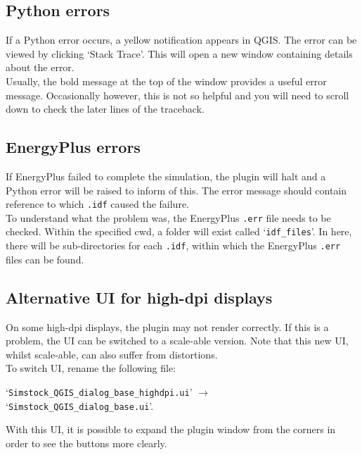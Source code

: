 \documentclass{article}
\begin{document}
\subsection{Python errors}
If a Python error occurs, a yellow notification appears in QGIS. The error can be viewed by clicking `Stack Trace'. This will open a new window containing details about the error. \\

Usually, the bold message at the top of the window provides a useful error message. Occasionally however, this is not so helpful and you will need to scroll down to check the later lines of the traceback.

\subsection{EnergyPlus errors}
If EnergyPlus failed to complete the simulation, the plugin will halt and a Python error will be raised to inform of this. The error message should contain reference to which \texttt{.idf} caused the failure. \\

To understand what the problem was, the EnergyPlus \texttt{.err} file needs to be checked. Within the specified cwd, a folder will exist called `\texttt{idf\_files}'. In here, there will be sub-directories for each \texttt{.idf}, within which the EnergyPlus \texttt{.err} files can be found.


\subsection{Alternative UI for high-dpi displays}
\label{section:highdpi}
On some high-dpi displays, the plugin may not render correctly. If this is a problem, the UI can be switched to a scale-able version. Note that this new UI, whilst scale-able, can also suffer from distortions. \\

To switch UI, rename the following file:
\begin{center}
`\texttt{Simstock\_QGIS\_dialog\_base\_highdpi.ui}' \hspace{2mm} $\rightarrow$ \hspace{2mm} `\texttt{Simstock\_QGIS\_dialog\_base.ui}'.
\end{center}
With this UI, it is possible to expand the plugin window from the corners in order to see the buttons more clearly. \\
\end{document}
